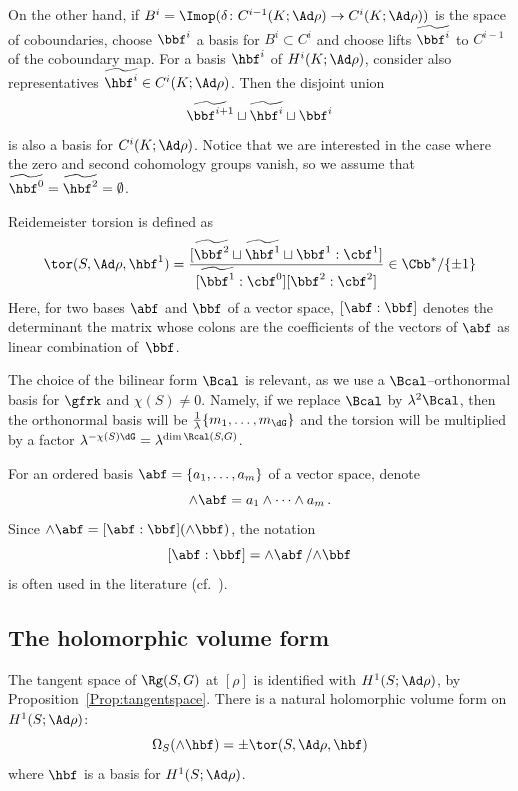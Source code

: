 On the other hand, if $B^i=\Imop(\delta\colon C^{i-1}(K;\Ad\rho)\to C^i(K;\Ad\rho)) $ is the space of coboundaries, choose $\bbf^i$ a basis for $B^i\subset C^i$ and choose lifts $\widetilde{\bbf^i}$ to $C^{i-1}$ of the coboundary map. For a basis $\hbf^i$ of $H^i(K;\Ad\rho)$, consider also representatives $\widetilde{\hbf^i}\in C^i(K;\Ad\rho)$. Then the disjoint union
\[
\widetilde{\bbf^{i+1}}\sqcup \widetilde{\hbf^i} \sqcup {\bbf^i}
\]
is also a basis for $C^i(K;\Ad\rho)$. Notice that we are interested in the case where the zero and second cohomology groups vanish, so we assume that $\widetilde{\hbf^0}=\widetilde{\hbf^2}=\emptyset$.


Reidemeister torsion is defined as
\begin{equation}
\tor(S,\Ad\rho, \hbf^1)=
\frac{[\widetilde{\bbf^2}\sqcup \widetilde{\hbf^1} \sqcup {\bbf^1}: \cbf^1]}{[\widetilde{\bbf^1} : \cbf^0] [{\bbf^2} : \cbf^2]}
\in\Cbb^*/\{\pm 1\}
\end{equation}
Here, for two bases $\abf$ and $\bbf$ of a vector space, $[\abf:\bbf]$ denotes the determinant the matrix whose colons are the coefficients of the vectors of $\abf$ as linear combination of~$\bbf$.

\begin{rema}\label{rem:factorTorsion}
The choice of the bilinear form $\Bcal$ is relevant, as we use a $\Bcal$--orthonormal basis for $\gfrk$ and $\chi(S)\neq 0$. Namely, if we replace $\Bcal$ by $\lambda^2\Bcal$, then the orthonormal basis will be $\frac1\lambda\{m_1,\dots,m_{\dG}\}$ and the torsion will be multiplied by a factor $\lambda^{-\chi(S)\dG}= \lambda^{\dim \Rcal(S,G)} $.
\end{rema}



For an ordered basis $\abf=\{a_1,\dots, a_m\}$ of a vector space, denote
\[
\wedge\abf=a_1\wedge\dots \wedge a_m\,.
\]
Since $\wedge\abf= [\abf:\bbf] (\wedge\bbf)$, the notation
\[
[\abf:\bbf] = \wedge\abf \, \slash {\wedge\bbf}
\]
is often used in the literature (cf.~\cite{MilnorDuality}).


\subsection{The holomorphic volume form} The tangent space of $\Rg(S,G) $ at $[\rho]$ is identified with $H^1(S; \Ad\rho)$, by Proposition~\ref{Prop:tangentspace}. There is a natural holomorphic volume form on $H^1(S; \Ad\rho)$:
\[
\Omega_S(\wedge \hbf)=\pm \tor(S,\Ad\rho,\hbf)
\]
where $ \hbf $ is a basis for $H^1(S;\Ad\rho)$.

